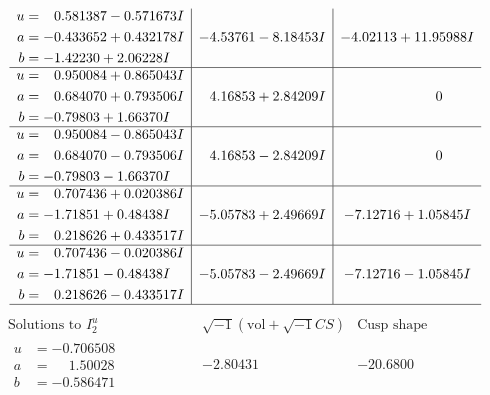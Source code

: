 \documentclass[1p]{elsarticle_modified}
\theoremstyle{definition}
\newcommand{\I}{\sqrt{-1}}
\begin{document}
$$\begin{array}{c|c|c}
\begin{aligned}
u &= \phantom{-}0.581387 - 0.571673 I \\
a &= -0.433652 + 0.432178 I \\
b &= -1.42230 + 2.06228 I\end{aligned}
 & -4.53761 - 8.18453 I & -4.02113 + 11.95988 I \\ \hline\begin{aligned}
u &= \phantom{-}0.950084 + 0.865043 I \\
a &= \phantom{-}0.684070 + 0.793506 I \\
b &= -0.79803 + 1.66370 I\end{aligned}
 & \phantom{-}4.16853 + 2.84209 I & \phantom{-0.000000 } 0 \\ \hline\begin{aligned}
u &= \phantom{-}0.950084 - 0.865043 I \\
a &= \phantom{-}0.684070 - 0.793506 I \\
b &= -0.79803 - 1.66370 I\end{aligned}
 & \phantom{-}4.16853 - 2.84209 I & \phantom{-0.000000 } 0 \\ \hline\begin{aligned}
u &= \phantom{-}0.707436 + 0.020386 I \\
a &= -1.71851 + 0.48438 I \\
b &= \phantom{-}0.218626 + 0.433517 I\end{aligned}
 & -5.05783 + 2.49669 I & -7.12716 + 1.05845 I \\ \hline\begin{aligned}
u &= \phantom{-}0.707436 - 0.020386 I \\
a &= -1.71851 - 0.48438 I \\
b &= \phantom{-}0.218626 - 0.433517 I\end{aligned}
 & -5.05783 - 2.49669 I & -7.12716 - 1.05845 I\\
 \hline 
 \end{array}$$\newpage$$\begin{array}{c|c|c}  
\text{Solutions to }I^u_{2}& \I (\text{vol} + \sqrt{-1}CS) & \text{Cusp shape}\\
 \hline 
\begin{aligned}
u &= -0.706508\phantom{ +0.000000I} \\
a &= \phantom{-}1.50028\phantom{ +0.000000I} \\
b &= -0.586471\phantom{ +0.000000I}\end{aligned}
 & -2.80431\phantom{ +0.000000I} & -20.6800\phantom{ +0.000000I} \\ \hline\begin{aligned}

\end{aligned}
\end{array}$$
\end{document}
